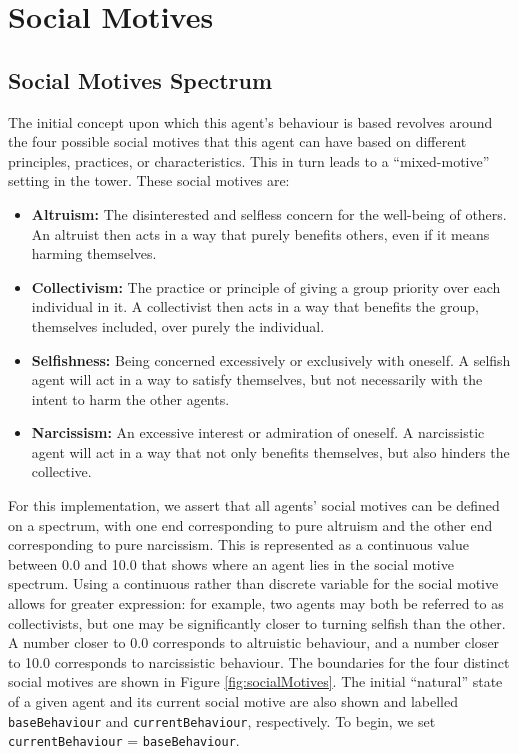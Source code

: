 \section{Social Motives}\label{social_motives}
\subsection{Social Motives Spectrum}
The initial concept upon which this agent's behaviour is based revolves around the four possible social motives \cite{socMot} that this agent can have based on different principles, practices, or characteristics. This in turn leads to a ``mixed-motive'' setting \cite{schellingConflict} in the tower. These social motives are: 

\begin{itemize}
    \item \textbf{Altruism:} The disinterested and selfless concern for the well-being of others. An altruist then acts in a way that purely benefits others, even if it means harming themselves.
    \item \textbf{Collectivism:} The practice or principle of giving a group priority over each individual in it. A collectivist then acts in a way that benefits the group, themselves included, over purely the individual.
    \item \textbf{Selfishness:} Being concerned excessively or exclusively with oneself. A selfish agent will act in a way to satisfy themselves, but not necessarily with the intent to harm the other agents.
    \item \textbf{Narcissism:} An excessive interest or admiration of oneself. A narcissistic agent will act in a way that not only benefits themselves, but also hinders the collective.
\end{itemize}

For this implementation, we assert that all agents' social motives can be defined on a spectrum, with one end corresponding to pure altruism and the other end corresponding to pure narcissism. This is represented as a continuous value between 0.0 and 10.0 that shows where an agent lies in the social motive spectrum. Using a continuous rather than discrete variable for the social motive allows for greater expression: for example, two agents may both be referred to as collectivists, but one may be significantly closer to turning selfish than the other. A number closer to 0.0 corresponds to altruistic behaviour, and a number closer to 10.0 corresponds to narcissistic behaviour. The boundaries for the four distinct social motives are shown in Figure \ref{fig:socialMotives}. The initial “natural” state of a given agent and its current social motive are also shown and labelled \texttt{baseBehaviour} and \texttt{currentBehaviour}, respectively. To begin, we set \texttt{currentBehaviour} = \texttt{baseBehaviour}.

